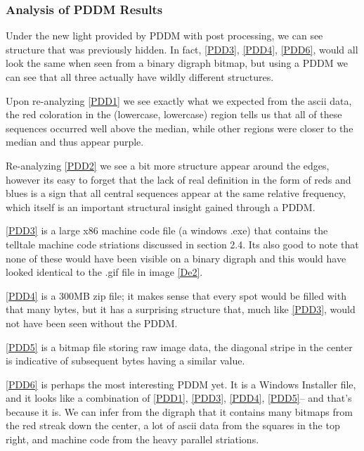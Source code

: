 \documentclass[12pt,a4paper]{article}
\begin{document}
\subsubsection{Analysis of PDDM Results}
Under the new light provided by PDDM with post processing, we can see structure 
that was previously hidden. In fact, \ref{PDD3}, \ref{PDD4}, \ref{PDD6}, would all look the same when seen from a binary digraph bitmap, but using a PDDM we can see that all three actually have wildly different structures. 

Upon re-analyzing \ref{PDD1} we see exactly what we expected from the ascii data, the red coloration in the (lowercase, lowercase) region tells us that all of these sequences occurred well above the median, while other regions were closer to the median and thus appear purple.

Re-analyzing \ref{PDD2} we see a bit more structure appear around the edges, however its easy to forget that the lack of real definition in the form of reds and blues is a sign that all central sequences appear at the same relative frequency, which itself is an important structural insight gained through a PDDM.

\ref{PDD3} is a large x86 machine code file (a windows .exe) that contains the telltale machine code striations discussed in section 2.4. Its also good to note that none of these would have been visible on a binary digraph and this would have looked identical to the .gif file in image \ref{De2}.

\ref{PDD4} is a 300MB zip file; it makes sense that every spot would be filled with that many bytes, but it has a surprising structure that, much like \ref{PDD3}, would not have been seen without the PDDM.

\ref{PDD5} is a bitmap file storing raw image data, the diagonal stripe in the center is indicative of subsequent bytes having a similar value. \cite{future}

\ref{PDD6} is perhaps the most interesting PDDM yet. It is a Windows Installer file, and it looks like a combination of \ref{PDD1}, \ref{PDD3}, \ref{PDD4}, \ref{PDD5}-- and that's because it is. We can infer from the digraph that it contains many bitmaps from the red streak down the center, a lot of ascii data from the squares in the top right, and machine code from the heavy parallel striations. 

\newpage


\end{document}
